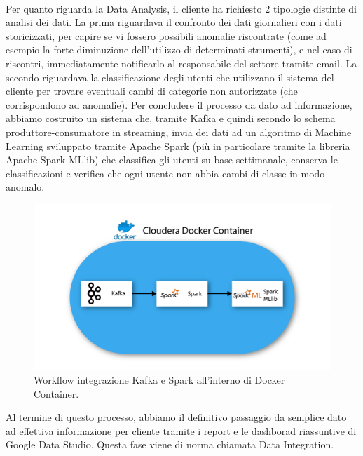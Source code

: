 \\
Per quanto riguarda la Data Analysis, il cliente ha richiesto 2 tipologie distinte di analisi dei dati.
La prima riguardava il confronto dei dati giornalieri con i dati storicizzati, per capire se vi fossero possibili anomalie riscontrate (come ad esempio la forte diminuzione dell'utilizzo di determinati strumenti), e nel caso di riscontri, immediatamente notificarlo al responsabile del settore tramite email.
La secondo riguardava la classificazione degli utenti che utilizzano il sistema del cliente per trovare eventuali cambi di categorie non autorizzate (che corrispondono ad anomalie). Per concludere il processo da dato ad informazione, abbiamo costruito un sistema che, tramite Kafka e quindi secondo lo schema produttore-consumatore in streaming, invia dei dati ad un algoritmo di Machine Learning sviluppato tramite Apache Spark (più in particolare tramite la libreria Apache Spark MLlib) che classifica gli utenti su base settimanale, conserva le classificazioni e verifica che ogni utente non abbia cambi di classe in modo anomalo.
\begin{figure}[h!]
	\centering
	\includegraphics[scale=0.5]{figures/kafka_spark}
	\caption[Workflow progetto	.]{Workflow integrazione Kafka e Spark all'interno di Docker Container.
		\label{fig:logoGCP}}
\end{figure}	

Al termine di questo processo, abbiamo il definitivo passaggio da semplice dato ad effettiva informazione per cliente tramite i report e le dashborad riassuntive di Google Data Studio. Questa fase viene di norma chiamata Data Integration.

